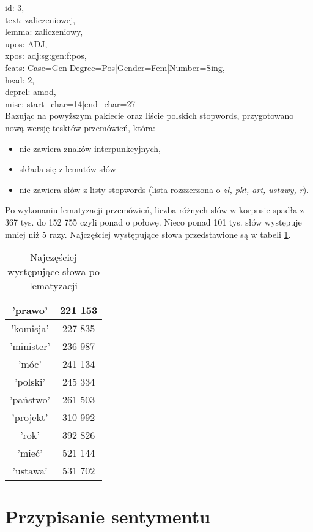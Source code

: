 \documentclass[a4paper,11pt,twoside]{report}
\theoremstyle{definition}
\begin{document}
      id: 3,\\
      text: zaliczeniowej,\\
      lemma: zaliczeniowy,\\
      upos: ADJ,\\
      xpos: adj:sg:gen:f:pos,\\
      feats: Case=Gen|Degree=Pos|Gender=Fem|Number=Sing,\\
      head: 2,\\
      deprel: amod,\\
      misc: start\_char=14|end\_char=27\\

Bazując na powyższym pakiecie oraz liście polskich stopwords, przygotowano nową wersję tesktów przemówień, która: \begin{itemize}
\item nie zawiera znaków interpunkcyjnych,
\item składa się z lematów słów
\item nie zawiera słów z listy stopwords (lista rozszerzona o \textit{zł, pkt, art, ustawy, r}).
\end{itemize}

Po wykonaniu lematyzacji przemówień, liczba różnych słów w korpusie spadła z 367 tys. do 152 755 czyli ponad o połowę. Nieco ponad 101 tys. słów występuje mniej niż 5 razy.
Najczęściej występujące słowa przedstawione są w tabeli \ref{tab:najcz}.
\begin{table}[h] \centering
\begin{tabular}{|c|c|} 
\hline
'prawo' & 221 153 \\ \hline
 'komisja' & 227 835 \\ \hline
 'minister' & 236 987 \\ \hline
 'móc' & 241 134 \\ \hline
 'polski' & 245 334 \\ \hline
 'państwo' & 261 503 \\ \hline
 'projekt' & 310 992 \\ \hline
 'rok' & 392 826 \\ \hline
 'mieć' & 521 144 \\ \hline
 'ustawa' & 531 702 \\ \hline \end{tabular} \caption{Najczęściej występujące słowa po lematyzacji} \label{tab:najcz}
\end{table}

\section{Przypisanie sentymentu} \label{section:sent}
\end{document}
